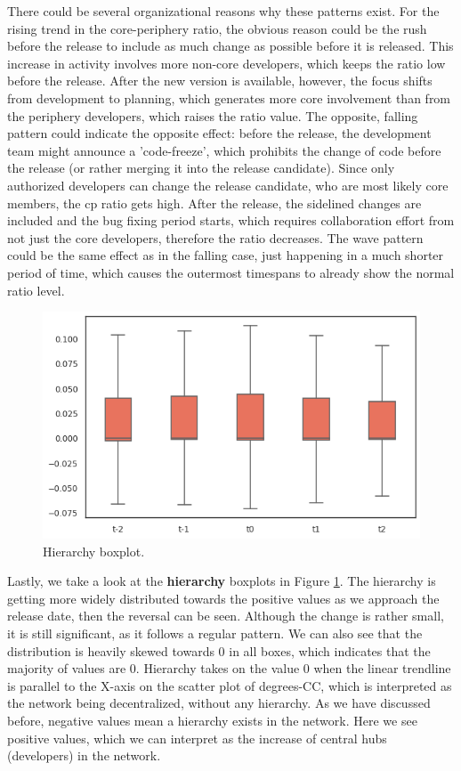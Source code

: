 There could be several organizational reasons why these patterns exist. For the rising trend in the core-periphery ratio, the obvious reason could be the rush before the release to include as much change as possible before it is released. This increase in activity involves more non-core developers, which keeps the ratio low before the release. After the new version is available, however, the focus shifts from development to planning, which generates more core involvement than from the periphery developers, which raises the ratio value. The opposite, falling pattern could indicate the opposite effect: before the release, the development team might announce a 'code-freeze', which prohibits the change of code before the release (or rather merging it into the release candidate). Since only authorized developers can change the release candidate, who are most likely core members, the cp ratio gets high. After the release, the sidelined changes are included and the bug fixing period starts, which requires collaboration effort from not just the core developers, therefore the ratio decreases. The wave pattern could be the same effect as in the falling case, just happening in a much shorter period of time, which causes the outermost timespans to already show the normal ratio level. \\

\begin{figure}
    \centering
    \includegraphics[width=\textwidth]{figures/quantitative/boxplots/hierarchy.png}
    \caption{Hierarchy boxplot.}
    \label{fig:hierarchy-box}
\end{figure}

Lastly, we take a look at the \textbf{hierarchy} boxplots in Figure \ref{fig:hierarchy-box}. The hierarchy is getting more widely distributed towards the positive values as we approach the release date, then the reversal can be seen. Although the change is rather small, it is still significant, as it follows a regular pattern. We can also see that the distribution is heavily skewed towards $0$ in all boxes, which indicates that the majority of values are $0$. Hierarchy takes on the value $0$ when the linear trendline is parallel to the X-axis on the scatter plot of degrees-CC, which is interpreted as the network being decentralized, without any hierarchy. As we have discussed before, negative values mean a hierarchy exists in the network. Here we see positive values, which we can interpret as the increase of central hubs (developers) in the network. 

